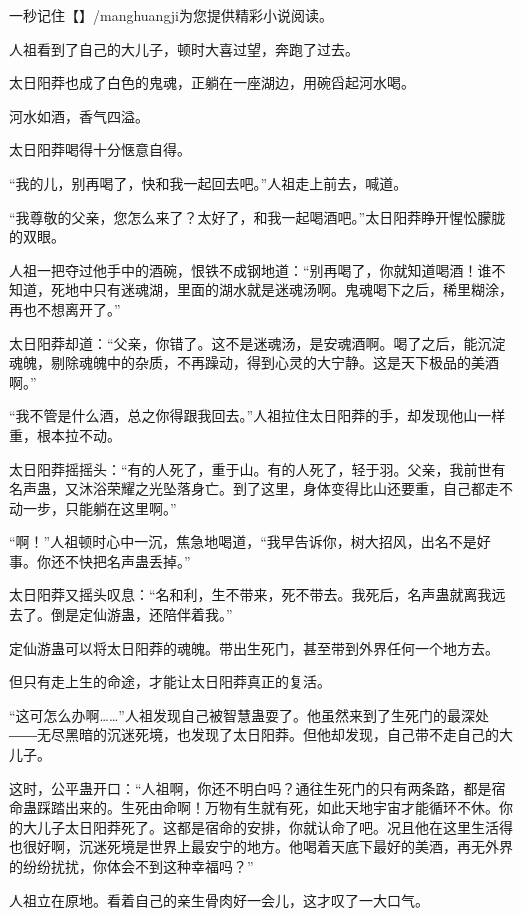 
\begin{this_body}

一秒记住【】/manghuangji为您提供精彩小说阅读。

人祖看到了自己的大儿子，顿时大喜过望，奔跑了过去。

太日阳莽也成了白色的鬼魂，正躺在一座湖边，用碗舀起河水喝。

河水如酒，香气四溢。

太日阳莽喝得十分惬意自得。

“我的儿，别再喝了，快和我一起回去吧。”人祖走上前去，喊道。

“我尊敬的父亲，您怎么来了？太好了，和我一起喝酒吧。”太日阳莽睁开惺忪朦胧的双眼。

人祖一把夺过他手中的酒碗，恨铁不成钢地道：“别再喝了，你就知道喝酒！谁不知道，死地中只有迷魂湖，里面的湖水就是迷魂汤啊。鬼魂喝下之后，稀里糊涂，再也不想离开了。”

太日阳莽却道：“父亲，你错了。这不是迷魂汤，是安魂酒啊。喝了之后，能沉淀魂魄，剔除魂魄中的杂质，不再躁动，得到心灵的大宁静。这是天下极品的美酒啊。”

“我不管是什么酒，总之你得跟我回去。”人祖拉住太日阳莽的手，却发现他山一样重，根本拉不动。

太日阳莽摇摇头：“有的人死了，重于山。有的人死了，轻于羽。父亲，我前世有名声蛊，又沐浴荣耀之光坠落身亡。到了这里，身体变得比山还要重，自己都走不动一步，只能躺在这里啊。”

“啊！”人祖顿时心中一沉，焦急地喝道，“我早告诉你，树大招风，出名不是好事。你还不快把名声蛊丢掉。”

太日阳莽又摇头叹息：“名和利，生不带来，死不带去。我死后，名声蛊就离我远去了。倒是定仙游蛊，还陪伴着我。”

定仙游蛊可以将太日阳莽的魂魄。带出生死门，甚至带到外界任何一个地方去。

但只有走上生的命途，才能让太日阳莽真正的复活。

“这可怎么办啊……”人祖发现自己被智慧蛊耍了。他虽然来到了生死门的最深处――无尽黑暗的沉迷死境，也发现了太日阳莽。但他却发现，自己带不走自己的大儿子。

这时，公平蛊开口：“人祖啊，你还不明白吗？通往生死门的只有两条路，都是宿命蛊踩踏出来的。生死由命啊！万物有生就有死，如此天地宇宙才能循环不休。你的大儿子太日阳莽死了。这都是宿命的安排，你就认命了吧。况且他在这里生活得也很好啊，沉迷死境是世界上最安宁的地方。他喝着天底下最好的美酒，再无外界的纷纷扰扰，你体会不到这种幸福吗？”

人祖立在原地。看着自己的亲生骨肉好一会儿，这才叹了一大口气。


\end{this_body}
